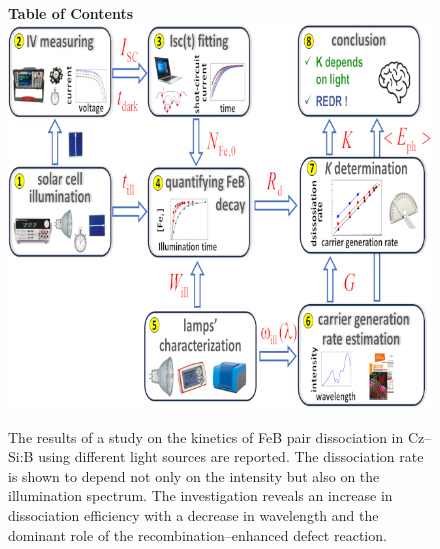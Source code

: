 \documentclass{WileyMSP-template}
\begin{document}
%
%
\begin{figure}
\textbf{Table of Contents}\\
\medskip
  \includegraphics{toc-image.png}
  \medskip
  \caption*{The results of a study on the kinetics of FeB pair dissociation in Cz--Si:B using different light sources are reported. 
  The dissociation rate is shown to depend not only on the intensity but also on the illumination spectrum. 
  The investigation reveals an increase in dissociation efficiency with a decrease in wavelength and the dominant role of the recombination--enhanced defect reaction.
}
\end{figure}
\end{document}
